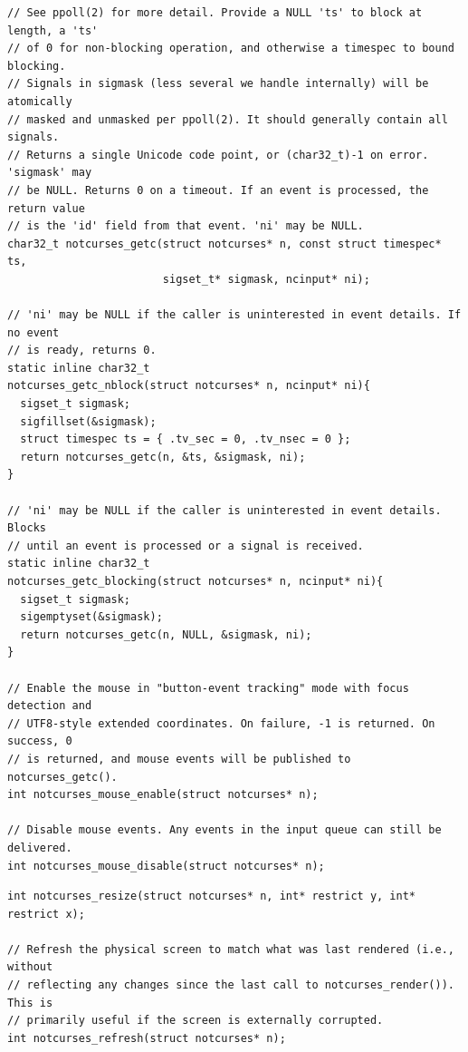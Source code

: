 \documentclass[letterpaper,10pt]{article}
\begin{document}
\begin{listing}[!htbp]
\begin{verbatim}
// See ppoll(2) for more detail. Provide a NULL 'ts' to block at length, a 'ts'
// of 0 for non-blocking operation, and otherwise a timespec to bound blocking.
// Signals in sigmask (less several we handle internally) will be atomically
// masked and unmasked per ppoll(2). It should generally contain all signals.
// Returns a single Unicode code point, or (char32_t)-1 on error. 'sigmask' may
// be NULL. Returns 0 on a timeout. If an event is processed, the return value
// is the 'id' field from that event. 'ni' may be NULL.
char32_t notcurses_getc(struct notcurses* n, const struct timespec* ts,
                        sigset_t* sigmask, ncinput* ni);

// 'ni' may be NULL if the caller is uninterested in event details. If no event
// is ready, returns 0.
static inline char32_t
notcurses_getc_nblock(struct notcurses* n, ncinput* ni){
  sigset_t sigmask;
  sigfillset(&sigmask);
  struct timespec ts = { .tv_sec = 0, .tv_nsec = 0 };
  return notcurses_getc(n, &ts, &sigmask, ni);
}

// 'ni' may be NULL if the caller is uninterested in event details. Blocks
// until an event is processed or a signal is received.
static inline char32_t
notcurses_getc_blocking(struct notcurses* n, ncinput* ni){
  sigset_t sigmask;
  sigemptyset(&sigmask);
  return notcurses_getc(n, NULL, &sigmask, ni);
}

// Enable the mouse in "button-event tracking" mode with focus detection and
// UTF8-style extended coordinates. On failure, -1 is returned. On success, 0
// is returned, and mouse events will be published to notcurses_getc().
int notcurses_mouse_enable(struct notcurses* n);

// Disable mouse events. Any events in the input queue can still be delivered.
int notcurses_mouse_disable(struct notcurses* n);
\end{verbatim}
\end{listing}

\begin{listing}[!htbp]
\begin{verbatim}
int notcurses_resize(struct notcurses* n, int* restrict y, int* restrict x);

// Refresh the physical screen to match what was last rendered (i.e., without
// reflecting any changes since the last call to notcurses_render()). This is
// primarily useful if the screen is externally corrupted.
int notcurses_refresh(struct notcurses* n);
\end{verbatim}
\end{listing}
\end{document}

